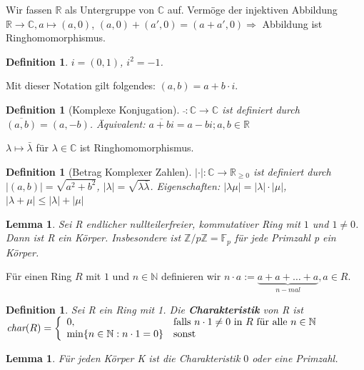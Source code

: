 \documentclass[12pt,a4paper]{article}
\theoremstyle{plain}
\newtheorem{Lemma}[Theorem]{Lemma}
\newtheorem{Definition}[Theorem]{Definition}
\newcommand{\herv}[1]{{\emph{\textbf{#1}}}}
\newcommand{\N}{\mathbb{N}}
\newcommand{\R}{\mathbb{R}}
\newcommand{\Z}{\mathbb{Z}}
\newcommand{\C}{\mathbb{C}}
\numberwithin{equation}{section}
\begin{document}
Wir fassen $\R$ als Untergruppe von $\C$ auf. Vermöge der injektiven Abbildung $\R\rightarrow \C, a\mapsto (a,0)$, $(a,0)+(a',0)=(a+a',0) \Rightarrow$ Abbildung ist Ringhomomorphismus.
\begin{Definition}
$i=(0,1)$, $i^2=-1$.
\end{Definition}
Mit dieser Notation gilt folgendes: $(a,b)=a+b\cdot i$.
\begin{Definition}[Komplexe Konjugation]
$\bar{ }:\C\rightarrow \C$ ist definiert durch $\overline{(a,b)}=(a,-b)$. Äquivalent: $\overline{a+b i}=a-b i; a,b\in \R$
\end{Definition}
$\lambda \mapsto \bar{\lambda}$ für $\lambda\in\C$ ist Ringhomomorphismus.
\begin{Definition}[Betrag Komplexer Zahlen]
$|\cdot |:\C\rightarrow \R_{\geq 0}$ ist definiert durch $|(a,b)|=\sqrt{a^2+b^2}$, $|\lambda|=\sqrt{\lambda\bar{\lambda}}$. Eigenschaften: $|\lambda\mu|=|\lambda|\cdot |\mu|$, $|\lambda + \mu|\leq |\lambda|+|\mu|$
\end{Definition}
\begin{Lemma}
Sei R endlicher nullteilerfreier, kommutativer Ring mit $1$ und $1\neq 0$. Dann ist R ein Körper. Insbesondere ist $\Z/p\Z=\mathbb{F}_p$ für jede Primzahl p ein Körper.
\end{Lemma}
Für einen Ring $R$ mit $1$ und $n\in\N$ definieren wir $n\cdot a:=\underbrace{a+a+\ldots+a}_{n-mal}, a\in R$.
\begin{Definition}
Sei R ein Ring mit 1. Die \herv{Charakteristik} von R ist \\$\emph{char}(R)=\left\lbrace\begin{array}{ll}0,&\text{falls }n\cdot 1\neq 0\text{ in }R\text{ für alle }n\in\N\\
\min\{n\in\N:n\cdot 1=0\}&\text{sonst}
\end{array}\right.$
\end{Definition}
\begin{Lemma}
Für jeden Körper K ist die Charakteristik $0$ oder eine Primzahl.
\end{Lemma}
\end{document}
